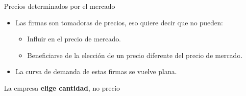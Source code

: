 \documentclass{beamer}
\begin{document}
\begin{frame}{Precios determinados por el mercado}
    \begin{itemize}
        \item Las firmas son tomadoras de precios, eso quiere decir que no pueden:
        \begin{itemize}
            \item Influir en el precio de mercado.
            \item Beneficiarse de la elección de un precio diferente del precio de mercado.
        \end{itemize}
        \item La curva de demanda de estas firmas se vuelve plana.
        \end{itemize}
        \begin{boxB}
            \centering
            La empresa \textbf{elige cantidad}, no precio
        \end{boxB}
        \begin{center}
        \begin{figure}[h!]
        \renewcommand{\figurename}{Figure}
        \begin{center}
            \begin{minipage}[b]{0.45\textwidth}
                \begin{center}
        \end{center}
            \end{minipage}
            \begin{minipage}[b]{0.45\textwidth}
            \begin{center}
        \end{center}
            \end{minipage}
        \end{center}
        \end{figure}
        \end{center} 
\end{frame}
\end{document}
